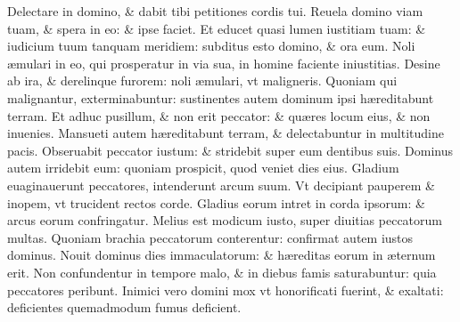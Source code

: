 \documentclass[a5paper,10pt]{book}
\def\ae{æ}
\begin{document}
\begin{multicols*}{2}
\newline \color{red} D\color{black}electare in domino, \& dabit tibi petitiones cordis tui.
\newline \color{red} R\color{black}euela domino viam tuam, \& spera in eo: \& ipse faciet.
\newline \color{red} E\color{black}t educet quasi lumen iustitiam tuam: \& iudicium tuum tanquam meridiem: subditus esto domino, \& ora eum.
\newline \color{red} N\color{black}oli \ae mulari in eo, qui prosperatur in via sua, in homine faciente iniustitias.
\newline \color{red} D\color{black}esine ab ira, \& derelinque furorem: noli \ae mulari, vt maligneris.
\newline \color{red} Q\color{black}uoniam qui malignantur, exterminabuntur: sustinentes autem dominum ipsi h\ae reditabunt terram.
\newline \color{red} E\color{black}t adhuc pusillum, \& non erit peccator: \& qu\ae res locum eius, \& non inuenies.
\newline \color{red} M\color{black}ansueti autem h\ae reditabunt terram, \& delectabuntur in multitudine pacis.
\newline \color{red} O\color{black}bseruabit peccator iustum: \& stridebit super eum dentibus suis.
\newline \color{red} D\color{black}ominus autem irridebit eum: quoniam prospicit, quod veniet dies eius.
\newline \color{red} G\color{black}ladium euaginauerunt peccatores, intenderunt arcum suum.
\newline \color{red} V\color{black}t decipiant pauperem \& inopem, vt trucident rectos corde.%
\newline \color{red} G\color{black}ladius eorum intret in corda ipsorum: \& arcus eorum confringatur.
\newline \color{red} M\color{black}elius est modicum iusto, super diuitias peccatorum multas.
\newline \color{red} Q\color{black}uoniam brachia peccatorum conterentur: confirmat autem iustos dominus.
\newline \color{red} N\color{black}ouit dominus dies immaculatorum: \& h\ae reditas eorum in \ae ternum erit.
\newline \color{red} N\color{black}on confundentur in tempore malo, \& in diebus famis saturabuntur: quia peccatores peribunt.
\newline \color{red} I\color{black}nimici vero domini mox vt honorificati fuerint, \& exaltati: deficientes quemadmodum fumus deficient.

\end{multicols*}
\end{document}
